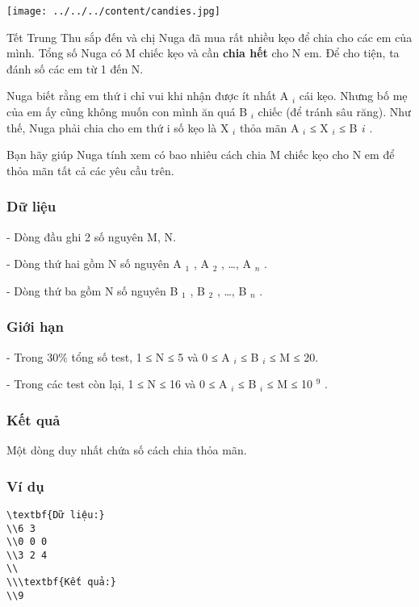 








\texttt{[image: ../../../content/candies.jpg]}

   Tết Trung Thu sắp đến và chị Nuga đã mua rất nhiều kẹo để chia cho các em của mình. Tổng số Nuga có M chiếc kẹo và cần   \textbf{    chia hết   }   cho N em. Để cho tiện, ta đánh số các em từ 1 đến N.  

   Nuga biết rằng em thứ i chỉ vui khi nhận được ít nhất A   $_    i   $   cái kẹo. Nhưng bố mẹ của em ấy cũng không muốn con mình ăn quá B   $_    i   $   chiếc (để tránh sâu răng). Như thế, Nuga phải chia cho em thứ i số kẹo là X   $_    i   $   thỏa mãn A   $_    i   $   ≤ X   $_    i   $   ≤ B   $_    ­i   $   .  

   Bạn hãy giúp Nuga tính xem có bao nhiêu cách chia M chiếc kẹo cho N em để thỏa mãn tất cả các yêu cầu trên.  

\subsubsection{   Dữ liệu  }

   - Dòng đầu ghi 2 số nguyên M, N.  

   - Dòng thứ hai gồm N số nguyên A   $_    1   $   , A   $_    2   $   , …, A   $_    n   $   .  

   - Dòng thứ ba gồm N số nguyên B   $_    1   $   , B   $_    2   $   , …, B   $_    n   $   .  

\subsubsection{\textbf{    Giới hạn   }}

   - Trong 30\% tổng số test, 1 ≤ N ≤ 5 và 0 ≤ A   $_    i   $   ≤ B   $_    i   $   ≤ M ≤ 20.  

   - Trong các test còn lại, 1 ≤ N ≤ 16 và 0 ≤ A   $_    i   $   ≤ B   $_    i   $   ≤ M ≤ 10   $^    9   $   .  

\subsubsection{   Kết quả  }

   Một dòng duy nhất chứa số cách chia thỏa mãn.  

\subsubsection{   Ví dụ  }
\begin{verbatim}
\textbf{Dữ liệu:}
\\6 3
\\0 0 0
\\3 2 4
\\
\\\textbf{Kết quả:}
\\9\end{verbatim}




